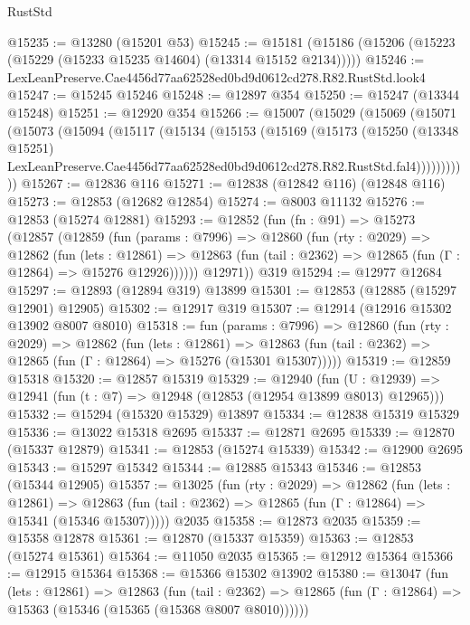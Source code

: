 \begin{lexlean}{RustStd}
\begin{coremodule}
@15235 := @13280 (@15201 @53)
@15245 := @15181 (@15186 (@15206 (@15223 (@15229 (@15233 @15235 @14604) (@13314 @15152 @2134)))))
@15246 := LexLeanPreserve.Cae4456d77aa62528ed0bd9d0612cd278.R82.RustStd.look4
@15247 := @15245 @15246
@15248 := @12897 @354
@15250 := @15247 (@13344 @15248)
@15251 := @12920 @354
@15266 := @15007
    (@15029
      (@15069
        (@15071
          (@15073
            (@15094
              (@15117
                (@15134
                  (@15153
                    (@15169
                      (@15173
                        (@15250
                          (@13348 @15251)
                          LexLeanPreserve.Cae4456d77aa62528ed0bd9d0612cd278.R82.RustStd.fal4)))))))))))
@15267 := @12836 @116
@15271 := @12838 (@12842 @116) (@12848 @116)
@15273 := @12853 (@12682 @12854)
@15274 := @8003 @11132
@15276 := @12853 (@15274 @12881)
@15293 := @12852
    (fun (fn : @91) =>
    @15273
      (@12857
        (@12859
          (fun (params : @7996) =>
          @12860
            (fun (rty : @2029) =>
            @12862
              (fun (lets : @12861) =>
              @12863 (fun (tail : @2362) => @12865 (fun (Γ : @12864) => @15276 @12926))))))
        @12971))
    @319
@15294 := @12977 @12684
@15297 := @12893 (@12894 @319) @13899
@15301 := @12853 (@12885 (@15297 @12901) @12905)
@15302 := @12917 @319
@15307 := @12914 (@12916 @15302 @13902 @8007 @8010)
@15318 := fun (params : @7996) =>
  @12860
    (fun (rty : @2029) =>
    @12862
      (fun (lets : @12861) =>
      @12863 (fun (tail : @2362) => @12865 (fun (Γ : @12864) => @15276 (@15301 @15307)))))
@15319 := @12859 @15318
@15320 := @12857 @15319
@15329 := @12940
    (fun (U : @12939) => @12941 (fun (t : @7) => @12948 (@12853 (@12954 @13899 @8013) @12965)))
@15332 := @15294 (@15320 @15329) @13897
@15334 := @12838 @15319 @15329
@15336 := @13022 @15318 @2695
@15337 := @12871 @2695
@15339 := @12870 (@15337 @12879)
@15341 := @12853 (@15274 @15339)
@15342 := @12900 @2695
@15343 := @15297 @15342
@15344 := @12885 @15343
@15346 := @12853 (@15344 @12905)
@15357 := @13025
    (fun (rty : @2029) =>
    @12862
      (fun (lets : @12861) =>
      @12863 (fun (tail : @2362) => @12865 (fun (Γ : @12864) => @15341 (@15346 @15307)))))
    @2035
@15358 := @12873 @2035
@15359 := @15358 @12878
@15361 := @12870 (@15337 @15359)
@15363 := @12853 (@15274 @15361)
@15364 := @11050 @2035
@15365 := @12912 @15364
@15366 := @12915 @15364
@15368 := @15366 @15302 @13902
@15380 := @13047
    (fun (lets : @12861) =>
    @12863
      (fun (tail : @2362) =>
      @12865 (fun (Γ : @12864) => @15363 (@15346 (@15365 (@15368 @8007 @8010))))))

\end{coremodule}
\end{lexlean}
